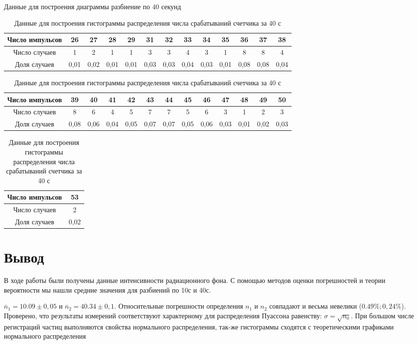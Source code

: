 \documentclass[a4paper]{article}
\begin{document}
Данные для построения диаграммы разбиение по 40 секунд 
\begin{table}[h]
\caption{Данные для построения гистограммы распределения числа срабатываний счетчика за 40 с}
\centering
\begin{tabular}{|c|c|c|c|c|c|c|c|c|c|c|c|c|}
\hline
Число импульсов & 26 & 27 & 28 & 29 & 31 & 32 & 33 & 34 & 35 & 36 & 37 & 38 \\ \hline
Число случаев   & 1  & 2  & 1  & 1  & 3  & 3  & 4  & 3  & 1  & 8  & 8  & 4  \\ \hline
Доля случаев    & 0,01 & 0,02 & 0,01 & 0,01 & 0,03 & 0,03 & 0,04 & 0,03 & 0,01 & 0,08 & 0,08 & 0,04 \\ \hline
\end{tabular}

\vspace{0.5cm}

\begin{tabular}{|c|c|c|c|c|c|c|c|c|c|c|c|c|}
\hline
Число импульсов & 39 & 40 & 41 & 42 & 43 & 44 & 45 & 46 & 47 & 48 & 49 & 50 \\ \hline
Число случаев   & 8  & 6  & 4  & 5  & 7  & 7  & 5  & 6  & 3  & 1  & 2  & 3  \\ \hline
Доля случаев    & 0,08 & 0,06 & 0,04 & 0,05 & 0,07 & 0,07 & 0,05 & 0,06 & 0,03 & 0,01 & 0,02 & 0,03 \\ \hline
\end{tabular}

\vspace{0.5cm}

\begin{tabular}{|c|c|}
\hline
Число импульсов & 53 \\ \hline
Число случаев   & 2  \\ \hline
Доля случаев    & 0,02 \\ \hline
\end{tabular}
\end{table}



\newpage
\section{Вывод}
В ходе работы были получены данные интенсивности радиационного фона. С помощью методов оценки погрешностей и теории вероятности мы нашли средние значения для разбиений по 10с и 40с.
 
 $\overline n_1 = 10.09 \pm 0,05$ и    $\overline n_2 = 40.34 \pm 0,1$. Относительные погрешности определения $n_1$ и $n_2$ совпадают и весьма невелики ($0.49 \%;  0,24\%$). Проверено, что результаты измерений соответствуют характерному для распределения Пуассона равенству: $\sigma = \sqrt{n_0}$. При большом числе регистраций частиц выполняются свойства нормального распределения, так-же гистограммы сходятся с теоретическими графиками нормального распределения
\end{document}
